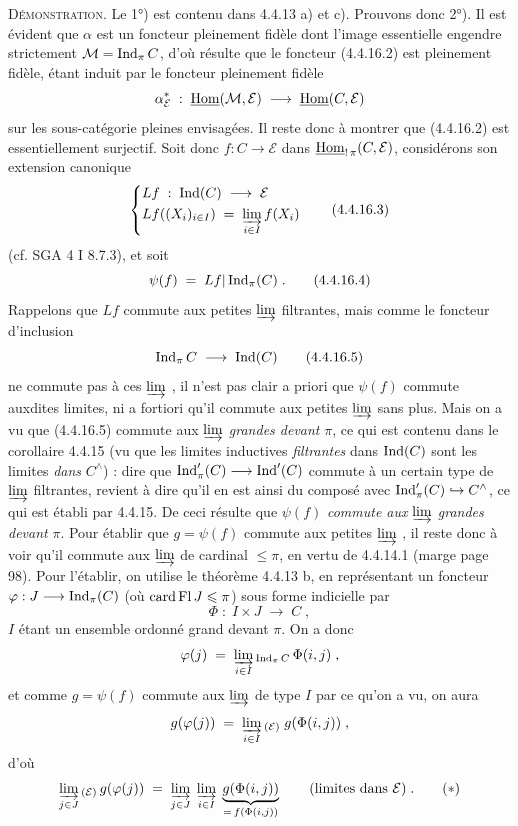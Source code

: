 \textsc{Démonstration}. Le 1°) est contenu dans 4.4.13 a) et c). Prouvons donc 2°). Il est évident que $\alpha$ est un foncteur pleinement fidèle dont l'image essentielle engendre strictement
$\mathcal{M}=\operatorname{Ind}_\pi C$, d'où résulte que le foncteur (4.4.16.2) est pleinement fidèle, étant induit par le foncteur pleinement fidèle
\[
\alpha^*_{\mathcal{E}}\;:\;\underline{\mathrm{Hom}}(\mathcal{M},\mathcal{E})\;\longrightarrow\;\underline{\mathrm{Hom}}(C,\mathcal{E})
\]
sur les sous-catégorie pleines envisagées. Il reste donc à montrer que (4.4.16.2) est essentiellement surjectif. Soit donc $f:C\longrightarrow\mathcal{E}$ dans $\underline{\mathrm{Hom}}_{!\,\pi}(C,\mathcal{E})$, considérons son extension canonique %
\[
\left\{
\begin{aligned}
&Lf\;:\;\operatorname{Ind}(C)\;\longrightarrow\;\mathcal{E}\\
&Lf((X_i)_{i\in I})\;=\;\varinjlim_{i\in I}f(X_i)
\end{aligned}
\right.
\tag*{(4.4.16.3)}
\]
(cf. SGA 4 I 8.7.3), et soit
\[
\psi(f)\;=\;Lf|\operatorname{Ind}_\pi(C)\;. \tag*{(4.4.16.4)}
\]
Rappelons que $Lf$ commute aux petites $\varinjlim$ filtrantes, mais comme le foncteur d'inclusion
\[
\operatorname{Ind}_\pi C\;\longrightarrow\;\operatorname{Ind}(C) \tag*{(4.4.16.5)}
\]
ne commute pas à ces $\varinjlim$ , il n'est pas clair a priori que $\psi(f)$ commute auxdites limites, ni a fortiori qu'il commute aux petites $\varinjlim$ sans plus. Mais on a vu que (4.4.16.5) commute aux $\varinjlim$ \textit{grandes devant} $\pi$, ce qui est contenu dans le corollaire 4.4.15 (vu que les limites inductives \textit{filtrantes} dans $\operatorname{Ind}(C)$ sont les limites \textit{dans} $C^\wedge$) : dire que $\operatorname{Ind}'_\pi(C)\longrightarrow\operatorname{Ind}'(C)$ commute à un certain type de $\varinjlim$ filtrantes, revient à dire qu'il en est ainsi du composé avec $\operatorname{Ind}'_\pi(C)\hookrightarrow C^\wedge$, ce qui est établi par 4.4.15. De ceci résulte que $\psi(f)$ \textit{commute aux} $\varinjlim$ \textit{grandes devant} $\pi$. Pour établir que $g=\psi(f)$ commute
aux petites $\varinjlim$ , il reste donc à voir qu'il commute aux $\varinjlim$ de cardinal $\leqslant\pi$, en vertu de 4.4.14.1 (marge page 98). Pour l'établir, on utilise le théorème 4.4.13 b, en représentant un foncteur $\varphi:J\longrightarrow\operatorname{Ind}_\pi(C)$ (où $\operatorname{card}\operatorname{Fl} J\leqslant\pi$) sous forme indicielle par
\[
\Phi\;:\;I\times J\;\longrightarrow\;C\;, \tag*{(4.4.16.6)}
\]
$I$ étant un ensemble ordonné grand devant $\pi$. On a donc
\[
\varphi(j)\;=\;\varinjlim_{i\in I}{}_{\operatorname{Ind}_\pi C}\,\Phi(i,j)\;,
\]
et comme $g=\psi(f)$ commute aux $\varinjlim$ de type $I$ par ce qu'on a vu, on aura
\[
g(\varphi(j))\;=\;\varinjlim_{i\in I}{}_{(\mathcal{E})}\;g(\Phi(i,j))\;,
\]
d'où
\[
\varinjlim_{j\in J}{}_{(\mathcal{E})}\,g(\varphi(j))\;=\;\varinjlim_{j\in J}\;\varinjlim_{i\in I}\;\underbrace{g(\Phi(i,j))}_{=\,f(\Phi(i,j))}\qquad\text{(limites dans $\mathcal{E}$)}\;. \tag*{$(*)$}
\]

